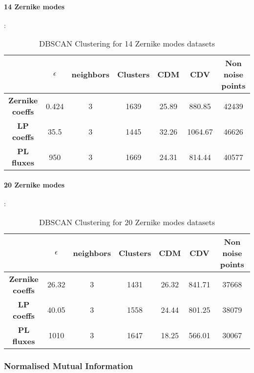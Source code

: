		\paragraph{14 Zernike modes}:
		\begin{table}[h!]
			\centering
			\begin{tabular}{|c|c|c|c|c|c|c|}
				\hline
				\textbf{} & \textbf{$\epsilon$} & \textbf{neighbors} & \textbf{Clusters} & \textbf{CDM} & \textbf{CDV} & \textbf{Non noise points}\\
				\hline
				\textbf{Zernike coeffs} & 0.424 & 3 & 1639 & 25.89 & 880.85 & 42439 \\
				\hline
				\textbf{LP coeffs} & 35.5 & 3 & 1445 & 32.26 & 1064.67 & 46626 \\
				\hline
				\textbf{PL fluxes} & 950 & 3 & 1669 & 24.31 & 814.44 & 40577 \\
				\hline
			\end{tabular}
		\caption{DBSCAN Clustering for 14 Zernike modes datasets}
		\end{table}
		\FloatBarrier
		
		\paragraph{20 Zernike modes}:
		\begin{table}[h!]
			\centering
			\begin{tabular}{|c|c|c|c|c|c|c|}
				\hline
				\textbf{} & \textbf{$\epsilon$} & \textbf{neighbors} & \textbf{Clusters} & \textbf{CDM} & \textbf{CDV} & \textbf{Non noise points}\\
				\hline
				\textbf{Zernike coeffs} & 26.32 & 3 & 1431 & 26.32 & 841.71 & 37668 \\
				\hline
				\textbf{LP coeffs} & 40.05 & 3 & 1558 & 24.44 & 801.25 & 38079 \\
				\hline
				\textbf{PL fluxes} & 1010 & 3 & 1647 & 18.25 & 566.01 & 30067 \\
				\hline
			\end{tabular}
		\caption{DBSCAN Clustering for 20 Zernike modes datasets}
		\end{table}
		\FloatBarrier
		
		
	\subsubsection{Normalised Mutual Information}
		
